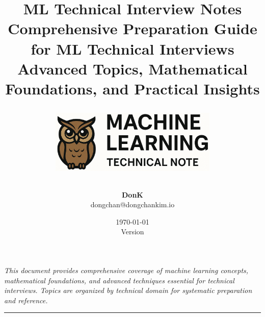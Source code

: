 \documentclass[11pt]{article}
\title{
  \vspace{2cm}
  \Huge\textbf{\textcolor{primaryteal}{ML Technical Interview Notes}} \\
  \vspace{1cm}
  \Large{Comprehensive Preparation Guide for ML Technical Interviews} \\
  \vspace{0.5cm}
  \large{Advanced Topics, Mathematical Foundations, and Practical Insights} \\
  \vspace{2cm}
  \begin{center}
    \includegraphics[width=0.6\textwidth]{p_logo.png}
  \end{center}
  \vspace{2cm}
}
\author{
  \Large\textbf{DonK} \\
  \large{dongchan@dongchankim.io} \\
}
\date{
  \large{\today} \\
  \small\textcolor{accentorange}{Version \docversion}
}
\begin{document}
\begin{titlepage}
  \maketitle
  \thispagestyle{empty}
  \vspace*{\fill}
  \begin{center}
    \begin{minipage}{0.8\textwidth}
      \centering
      \small\textit{
        This document provides comprehensive coverage of machine learning concepts, 
        mathematical foundations, and advanced techniques essential for technical interviews. Topics are organized by technical domain for systematic 
        preparation and reference.
      }
    \end{minipage}
  \end{center}
  \vspace{1cm}
  \begin{center}
    \textcolor{accentorange}{\rule{0.3\textwidth}{1pt}}
  \end{center}
\end{titlepage}

\newpage

\end{document}
